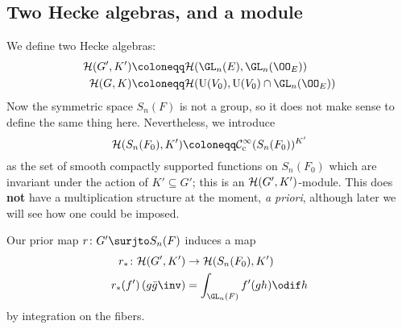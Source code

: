 \subsection{Two Hecke algebras, and a module}
We define two Hecke algebras:
\begin{align*}
  \HH(G', K') &\coloneqq \HH(\GL_n(E), \GL_n(\OO_E)) \\
  \HH(G, K) &\coloneqq \HH(\U(V_0), \U(V_0) \cap \GL_n(\OO_E))
\end{align*}
Now the symmetric space $S_n(F)$ is not a group,
so it does not make sense to define the same thing here.
Nevertheless, we introduce
\[ \HH(S_n(F_0), K') \coloneqq \mathcal C_{\mathrm{c}}^{\infty}(S_n(F_0))^{K'} \]
as the set of smooth compactly supported functions on $S_n(F_0)$
which are invariant under the action of $K' \subseteq G'$;
this is an $\mathcal H(G', K')$-module.
This does \textbf{not} have a multiplication structure at the moment, \emph{a priori},
although later we will see how one could be imposed.

Our prior map $r \colon G' \surjto S_n(F)$ induces a map
\begin{align*}
  r_\ast \colon \HH(G', K') &\to \HH(S_n(F_0), K') \\
  r_\ast(f')\left( g\bar{g}\inv \right) &= \int_{\GL_n(F)} f'(gh) \odif h
\end{align*}
by integration on the fibers.

